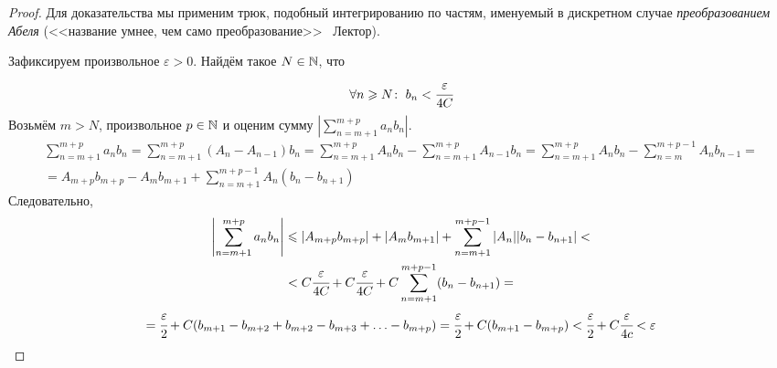 \documentclass[a4paper, 12pt]{article}
\begin{document}
\begin{proof}
	Для доказательства мы применим трюк, подобный интегрированию по частям, именуемый в дискретном случае \textit{преобразованием Абеля} (<<название умнее, чем само преобразование>> \textcopyright\ Лектор).
	\par  Зафиксируем произвольное $\varepsilon>0$. Найдём такое $N \in \mathbb{N}$, что 
	$$
		\forall n\geqslant N\colon\; b_n < \cfrac{\varepsilon}{4C}
	$$
	Возьмём $m>N$, произвольное $p\in \mathbb{N}$ и оценим сумму $\left|\sum\limits_{n=m + 1}^{m+p}a_n b_n\right|$.
	\begin{gather*}
		\sum\limits_{n=m+1}^{m+p} a_n b_n = \sum\limits_{n=m+1}^{m+p}\left(A_n - A_{n-1}\right)b_n = \sum\limits_{n=m+1}^{m+p} A_nb_n - \sum\limits_{n=m+1}^{m+p} A_{n-1} b_n = \sum\limits_{n=m+1}^{m+p}A_nb_n - \sum\limits_{n=m}^{m+p - 1}A_nb_{n-1} = \\
		= A_{m+p} b_{m+p} - A_mb_{m+1} + \sum\limits_{n=m+1}^{m+p - 1}A_n\left(b_n-b_{n+1}\right)
	\end{gather*}
	Следовательно, 
	\begin{gather*}
		\left|\sum\limits_{n=m+1}^{m+p} a_n b_n\right| \leqslant |A_{m+p}b_{m+p}| + |A_mb_{m+1}| + 		\sum\limits_{n=m+1}^{m+p-1} |A_n||b_n - b_{n+1}| <\\ < C\cfrac{\varepsilon}{4C} + C \cfrac{\varepsilon}{4C} + C 	\sum\limits_{n=m+1}^{m+p-1}( b_n - b_{n+1}) =\\= \cfrac{\varepsilon}{2} + C(b_{m+1} -b_{m+2} + b_{m + 2} - b_{m+3} + \ldots -b_{m+p}) = \cfrac{\varepsilon}{2} + C(b_{m+1} - b_{m+p}) < \cfrac{\varepsilon}{2} + C\cfrac{\varepsilon}{4c} < \varepsilon
	\end{gather*}
\end{proof}
\end{document}
